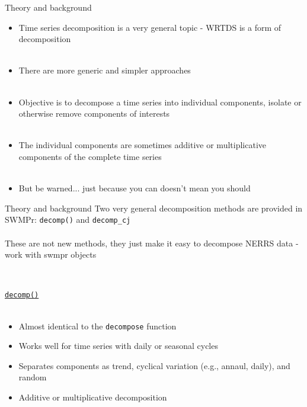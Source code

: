 \documentclass[xcolor=dvipsnames,serif]{beamer}\usepackage[]{graphicx}\usepackage[]{color}
\begin{document}
\begin{frame}{Theory and background}
\begin{itemize}
\item<1-> Time series decomposition is a very general topic - WRTDS is a form of decomposition \\~\\
\item<2-> There are more generic and simpler approaches \\~\\
\item<3-> Objective is to decompose a time series into individual components, isolate or otherwise remove components of interests \\~\\
\item<4-> The individual components are sometimes additive or multiplicative components of the complete time series \\~\\
\item<5-> But be warned... just because you can doesn't mean you should
\end{itemize}
\end{frame}

\begin{frame}[t]{Theory and background}
Two very general decomposition methods are provided in SWMPr: \texttt{decomp()} and \texttt{decomp_cj} \\~\\
These are not new methods, they just make it easy to decompose NERRS data - work with swmpr objects \\~\\
\begin{columns}[t]
\begin{column}{\textwidth}
\underline{\texttt{decomp()}} \\~\\
\begin{itemize}
\item<2-> Almost identical to the \texttt{decompose} function
\item<3-> Works well for time series with daily or seasonal cycles
\item<4-> Separates components as trend, cyclical variation (e.g., annaul, daily), and random
\item<5-> Additive or multiplicative decomposition
\end{itemize}
\end{column}
\end{columns}
\end{frame}
\end{document}
